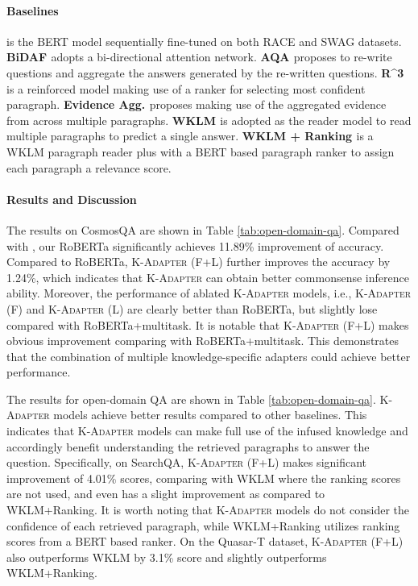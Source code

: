 \documentclass[11pt,a4paper]{article}
\begin{document}
\paragraph{Baselines}
\textbf{ \citep{huang2019cosmos}} is the BERT model sequentially fine-tuned on both RACE and SWAG datasets. \textbf{BiDAF \citep{Seo2016BidirectionalAF}} adopts a bi-directional attention network.
\textbf{AQA \citep{Buck2017AskTR}} proposes to re-write questions and aggregate the answers generated by the re-written questions.
\textbf{R\textasciicircum{}3 \citep{wang2017reinforced}} is a reinforced model making use of a ranker for selecting most confident paragraph. \textbf{Evidence Agg. \citep{wang2017evidence}} proposes making use of the aggregated evidence from across multiple paragraphs. \textbf{WKLM \citep{xiong2019pretrained}} is adopted as the reader model to read multiple paragraphs to predict a single answer.
\textbf{WKLM + Ranking \citep{xiong2019pretrained}} is a WKLM paragraph reader plus with a BERT based paragraph ranker to assign each paragraph a relevance score.


\paragraph{Results and Discussion}
The results on CosmosQA are shown in Table \ref{tab:open-domain-qa}. Compared with , our RoBERTa significantly achieves 11.89\% improvement of accuracy. 
Compared to RoBERTa, \textsc{K-Adapter} (F+L) further improves the accuracy by 1.24\%, which indicates that \textsc{K-Adapter} can obtain better commonsense inference ability. Moreover, the performance of ablated \textsc{K-Adapter} models, i.e., \textsc{K-Adapter} (F) and \textsc{K-Adapter} (L) are clearly better than RoBERTa, but slightly lose compared with RoBERTa+multitask. It is notable that \textsc{K-Adapter} (F+L) makes obvious improvement comparing with RoBERTa+multitask. This demonstrates that the combination of multiple knowledge-specific adapters could achieve better performance.

The results for open-domain QA are shown in Table \ref{tab:open-domain-qa}. \textsc{K-Adapter} models achieve better results compared to other baselines. This indicates that \textsc{K-Adapter} models can make full use of the infused knowledge and accordingly benefit understanding the retrieved paragraphs to answer the question. Specifically, on SearchQA, \textsc{K-Adapter} (F+L) makes significant improvement of 4.01\%  scores, comparing with WKLM where the ranking scores are not used, and even has a slight improvement as compared to WKLM+Ranking. It is worth noting that \textsc{K-Adapter} models do not consider the confidence of each retrieved paragraph, while WKLM+Ranking utilizes ranking scores from a BERT based ranker. On the Quasar-T dataset, \textsc{K-Adapter} (F+L) also outperforms WKLM by 3.1\%  score and slightly outperforms WKLM+Ranking. 
\end{document}
